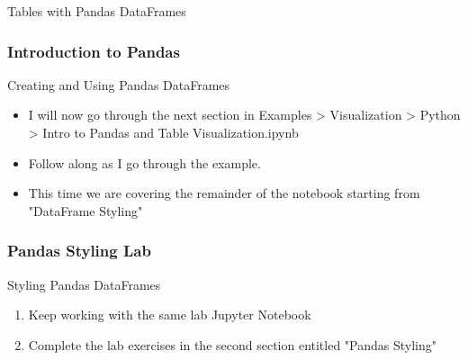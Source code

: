 \documentclass[handout, 11pt]{beamer}
\begin{document}
\begin{section}[Pandas]{Tables with Pandas DataFrames}
\begin{frame}
\frametitle{Introduction to Pandas}
{
\begin{block}{Creating and Using Pandas DataFrames}
\begin{itemize}
\item I will now go through the next section in Examples > Visualization > Python > Intro to Pandas and Table Visualization.ipynb
\item Follow along as I go through the example.
\item This time we are covering the remainder of the notebook starting from "DataFrame Styling"
\end{itemize}
\end{block}
}
\end{frame}
\begin{frame}
\frametitle{Pandas Styling Lab}
{
\begin{block}{Styling Pandas DataFrames}
\begin{enumerate}
\item Keep working with the same lab Jupyter Notebook
\item Complete the lab exercises in the second section entitled "Pandas Styling"
\end{enumerate}
\vfill
\end{block}
}
\label{labs:pandas-styling-lab-1}
\end{frame}
\end{section}
\end{document}
